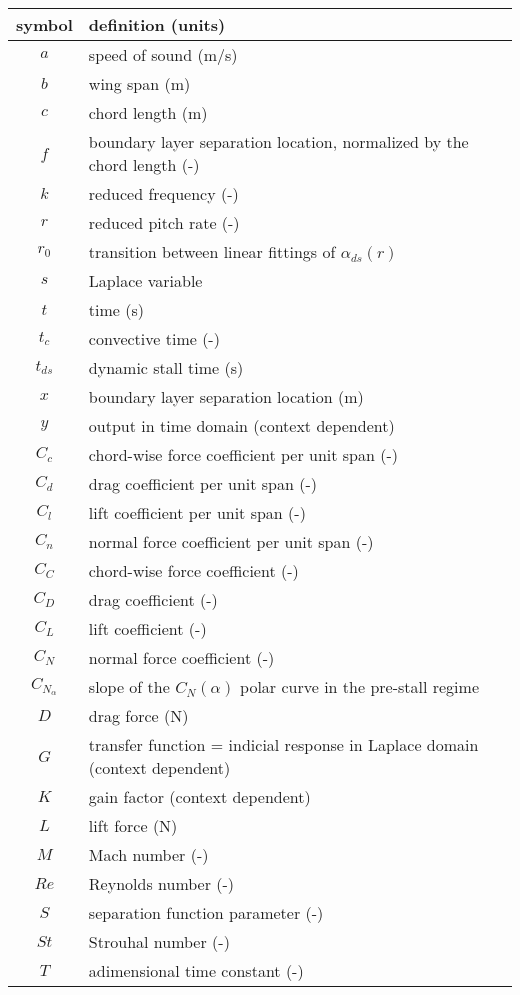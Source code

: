 \begin{tabular}{c|l}
\textbf{symbol} & \textbf{definition (units)} \\
\hline
$a$ & speed of sound (m/s) \\
$b$ & wing span (m) \\
$c$ & chord length (m) \\
$f$ & boundary layer separation location, normalized by the chord length (-) \\
$k$ & reduced frequency (-) \\
$r$ & reduced pitch rate (-) \\
$r_0$ & transition between linear fittings of $\alpha_{ds}(r)$ \\
$s$ & Laplace variable \\
$t$ & time (s) \\
$t_c$ & convective time (-) \\
$t_{ds}$ & dynamic stall time (s) \\
$x$ & boundary layer separation location (m) \\ 
$y$ & output in time domain (context dependent) \\
$C_c$ & chord-wise force coefficient per unit span (-) \\ 
$C_d$ & drag coefficient per unit span (-) \\
$C_l$ & lift coefficient per unit span (-) \\
$C_n$ & normal force coefficient per unit span (-) \\
$C_C$ & chord-wise force coefficient (-) \\
$C_D$ & drag coefficient (-) \\
$C_L$ & lift coefficient (-) \\
$C_N$ & normal force coefficient (-) \\
$C_{N_\alpha}$ & slope of the $C_N(\alpha)$ polar curve in the pre-stall regime \\
$D$ & drag force (N) \\
$G$ & transfer function =  indicial response in Laplace domain (context dependent)\\
$K$ & gain factor (context dependent) \\
$L$ & lift force (N) \\
$M$ & Mach number (-) \\
$Re$ & Reynolds number (-) \\
$S$ & separation function parameter (-) \\ 
$St$ & Strouhal number (-) \\
$T$ & adimensional time constant (-) \\

\end{tabular}
